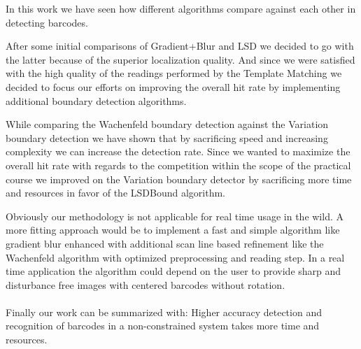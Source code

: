 In this work we have seen how different algorithms compare against each other in detecting barcodes.

After some initial comparisons of Gradient+Blur and LSD we decided to go with the latter because of the superior localization quality. And since we were satisfied with the high quality of the readings performed by the Template Matching we decided to focus our efforts on improving the overall hit rate by implementing additional boundary detection algorithms.

While comparing the Wachenfeld boundary detection against the Variation boundary detection we have shown that by sacrificing speed and increasing complexity we can increase the detection rate. Since we wanted to maximize the overall hit rate with regards to the competition within the scope of the practical course we improved on the Variation boundary detector by sacrificing more time and resources in favor of the LSDBound algorithm.

Obviously our methodology is not applicable for real time usage in the wild. A more fitting approach would be to implement a fast and simple algorithm like gradient blur enhanced with additional scan line based refinement like the Wachenfeld algorithm with optimized preprocessing and reading step. In a real time application the algorithm could depend on the user to provide sharp and disturbance free images with centered barcodes without rotation. 
\\
\\
Finally our work can be summarized with: Higher accuracy detection and recognition of barcodes in a non-constrained system takes more time and resources.